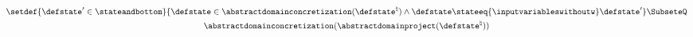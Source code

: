 \begin{gather*}
\setdef{\defstate'\in\stateandbottom}{\defstate\in\abstractdomainconcretization(\defstate^\natural) \land \defstate \stateeq{\inputvariableswithoutw} \defstate'} \SubseteQ \\
\abstractdomainconcretization(\abstractdomainproject(\defstate^\natural))
\end{gather*}
